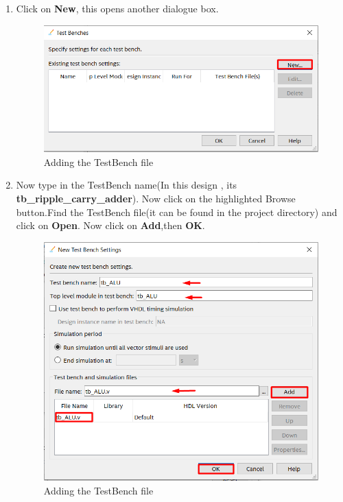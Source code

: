 \documentclass[12pt,singleside,a4paper]{article}
\begin{document}
\begin{enumerate}
    \item Click on \textbf{New}, this opens another dialogue box.
    \begin{figure}[H]
        \centering
    \includegraphics[width=14cm,keepaspectratio]{test4.png}
    \caption{Adding the TestBench file}
    \end{figure}
    \newpage
    \item Now type in the TestBench name(In this design , its \textbf{tb\_ripple\_carry\_adder}). Now click on the highlighted Browse button.Find the TestBench file(it can be found in the project directory) and click on \textbf{Open}. Now click on \textbf{Add},then \textbf{OK}.
            \begin{figure}[H]
        \centering
    \includegraphics[scale=0.73]{test5.png}
    \caption{Adding the TestBench file}
    \end{figure}
    
 \end{enumerate}
\end{document}

